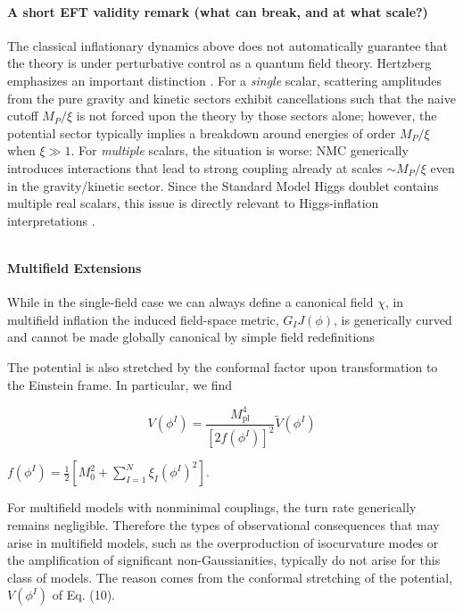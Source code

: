 \[\]
\paragraph{A short EFT validity remark (what can break, and at what scale?)}
The classical inflationary dynamics above does not automatically guarantee that the theory is under perturbative control as a quantum field theory. Hertzberg emphasizes an important distinction \cite{Hertzberg2010NMC}. For a \emph{single} scalar, scattering amplitudes from the pure gravity and kinetic sectors exhibit cancellations such that the naive cutoff $M_P/\xi$ is not forced upon the theory by those sectors alone; however, the potential sector typically implies a breakdown around energies of order $M_P/\xi$ when $\xi\gg 1$. For \emph{multiple} scalars, the situation is worse: NMC generically introduces interactions that lead to strong coupling already at scales $\sim M_P/\xi$ even in the gravity/kinetic sector. Since the Standard Model Higgs doublet contains multiple real scalars, this issue is directly relevant to Higgs-inflation interpretations \cite{Hertzberg2010NMC}.


\[\]
\paragraph{Multifield Extensions}

While in the single-field case we can always define a  canonical field $\chi$, in multifield inflation the induced field-space metric, $G_IJ(\phi)$, is generically curved and cannot be made globally canonical  by simple field redefinitions \cite{Kaiser2016NMC}




The potential is also stretched by the conformal factor upon transformation to the Einstein frame. In particular, we find

$$
V\left(\phi^I\right)=\frac{M_{\mathrm{pl}}^4}{\left[2 f\left(\phi^I\right)\right]^2} \tilde{V}\left(\phi^I\right)
$$

$f\left(\phi^I\right)=\frac{1}{2}\left[M_0^2+\sum_{I=1}^N \xi_I\left(\phi^I\right)^2\right]$.

For multifield models with nonminimal couplings, the turn rate generically remains negligible. Therefore the types of observational consequences that may arise in multifield models, such as the overproduction of isocurvature modes or the amplification of significant non-Gaussianities, typically do not arise for this class of models. The reason comes from the conformal stretching of the potential, $V\left(\phi^I\right)$ of Eq. (10).

